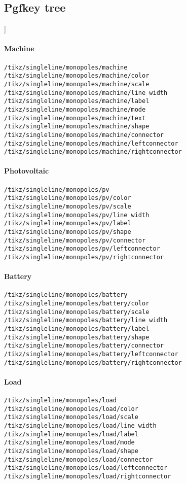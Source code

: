 \documentclass[a4]{article}
\begin{document}
\subsection{Pgfkey tree}]
\begin{footnotesize}
\paragraph{Machine}
\begin{verbatim}
/tikz/singleline/monopoles/machine
/tikz/singleline/monopoles/machine/color
/tikz/singleline/monopoles/machine/scale
/tikz/singleline/monopoles/machine/line width
/tikz/singleline/monopoles/machine/label
/tikz/singleline/monopoles/machine/mode
/tikz/singleline/monopoles/machine/text
/tikz/singleline/monopoles/machine/shape
/tikz/singleline/monopoles/machine/connector
/tikz/singleline/monopoles/machine/leftconnector
/tikz/singleline/monopoles/machine/rightconnector
\end{verbatim}
\paragraph{Photovoltaic}
\begin{verbatim}
/tikz/singleline/monopoles/pv
/tikz/singleline/monopoles/pv/color
/tikz/singleline/monopoles/pv/scale
/tikz/singleline/monopoles/pv/line width
/tikz/singleline/monopoles/pv/label
/tikz/singleline/monopoles/pv/shape
/tikz/singleline/monopoles/pv/connector
/tikz/singleline/monopoles/pv/leftconnector
/tikz/singleline/monopoles/pv/rightconnector
\end{verbatim}
\paragraph{Battery}
\begin{verbatim}
/tikz/singleline/monopoles/battery
/tikz/singleline/monopoles/battery/color
/tikz/singleline/monopoles/battery/scale
/tikz/singleline/monopoles/battery/line width
/tikz/singleline/monopoles/battery/label
/tikz/singleline/monopoles/battery/shape
/tikz/singleline/monopoles/battery/connector
/tikz/singleline/monopoles/battery/leftconnector
/tikz/singleline/monopoles/battery/rightconnector
\end{verbatim}
\paragraph{Load}
\begin{verbatim}
/tikz/singleline/monopoles/load
/tikz/singleline/monopoles/load/color
/tikz/singleline/monopoles/load/scale
/tikz/singleline/monopoles/load/line width
/tikz/singleline/monopoles/load/label
/tikz/singleline/monopoles/load/mode
/tikz/singleline/monopoles/load/shape
/tikz/singleline/monopoles/load/connector
/tikz/singleline/monopoles/load/leftconnector
/tikz/singleline/monopoles/load/rightconnector
\end{verbatim}

\end{footnotesize}
\end{document}
